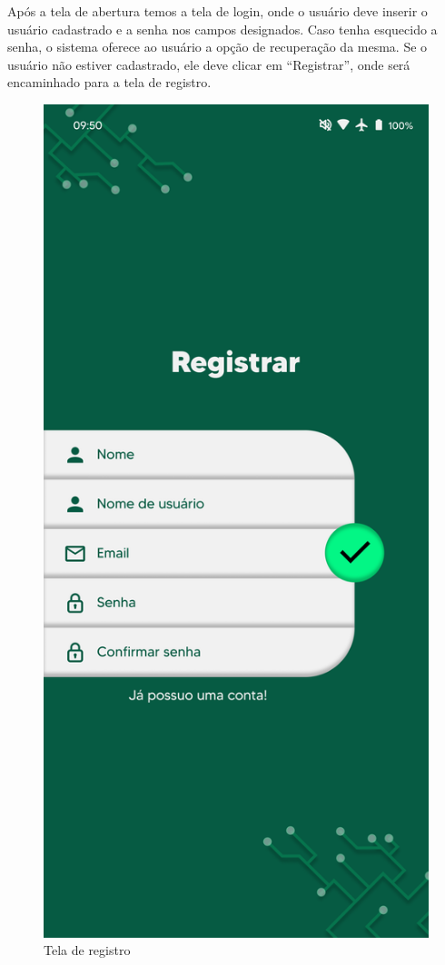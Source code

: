Após a tela de abertura temos a tela de login, onde o usuário deve inserir o usuário cadastrado e a senha nos campos designados. Caso tenha esquecido a senha, o sistema oferece ao usuário a opção de recuperação da mesma. Se o usuário não estiver cadastrado, ele deve clicar em “Registrar”, onde será encaminhado para a tela de registro.

\begin{figure}[!h]
\centering
\caption{Tela de registro}
\label{fig:picture3}
\includegraphics[scale=0.3]{Illustrations/Picture3.png}
\end{figure}

